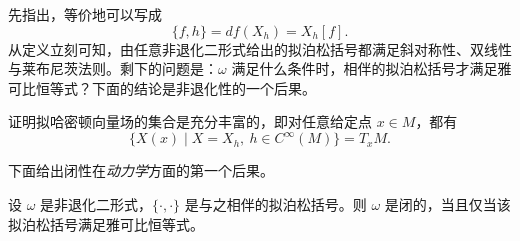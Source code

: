 先指出，等价地可以写成
\begin{equation}
  \{f,h\}=df(X_h)=X_h[f].
  \label{eq:2.2.6}
\end{equation}
从定义立刻可知，由任意非退化二形式给出的拟泊松括号都满足斜对称性、双线性与莱布尼茨法则。剩下的问题是：$\omega$ 满足什么条件时，相伴的拟泊松括号才满足雅可比恒等式？下面的结论是非退化性的一个后果。

\begin{exercise}
\label{ex:quasi-hamiltonian-ample}
证明拟哈密顿向量场的集合是充分丰富的，即对任意给定点 $x\in M$，都有
\[
  \{X(x)\mid X=X_h,\ h\in C^\infty(M)\}=T_xM.
\]
\end{exercise}

下面给出闭性在\emph{动力学}方面的第一个后果。

\begin{theorem}
\label{thm:closed-iff-jacobi}
设 $\omega$ 是非退化二形式，$\{\mathord\cdot,\mathord\cdot\}$ 是与之相伴的拟泊松括号。则 $\omega$ 是闭的，当且仅当该拟泊松括号满足雅可比恒等式。
\end{theorem}

